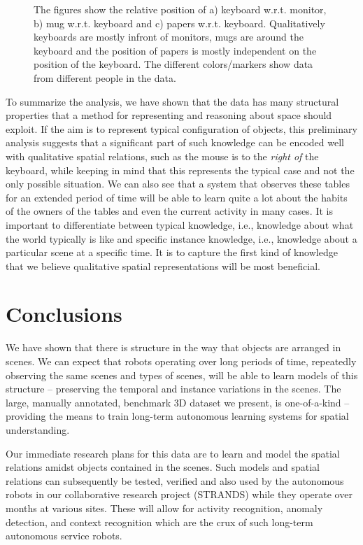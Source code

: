 \documentclass[letterpaper, 10 pt, conference]{ieeeconf}  %
\begin{document}
\begin{figure}[t]
\begin{center}
\end{center}
\caption{The figures show the relative position of a) keyboard w.r.t. monitor, b) mug w.r.t. keyboard and c) papers w.r.t. keyboard. Qualitatively keyboards are mostly infront of monitors, mugs are around the keyboard and the position of papers is mostly independent on the position of the keyboard. The different colors/markers show data from different people in the data.} 
\label{fig:scatter-rest}
\end{figure}

To summarize the analysis, we have shown that the data has many structural 
properties that a method for representing and reasoning about 
space should exploit. If the aim is to represent typical configuration of 
objects, this preliminary analysis suggests that a significant 
part of such knowledge can be encoded well with qualitative spatial 
relations, such as the mouse is to the \textit{right of} the keyboard, while 
keeping in mind that this represents the typical case and not the only 
possible situation. We can also see that a system that observes these tables for 
an extended period of time will be able to learn quite a lot about the 
habits of the owners of the tables and even the current activity in 
many cases. It is important to differentiate between typical knowledge, 
i.e., knowledge about what the world typically is like and specific 
instance knowledge, i.e., knowledge about a particular scene at a specific 
time. It is to capture the first kind of knowledge that we 
believe  qualitative spatial representations will be most beneficial. 

\section{Conclusions}
\label{sec:Conclusions}

We have shown that there is structure in the way that objects are
arranged in scenes.  We can expect that robots operating over long periods 
of time, repeatedly observing the same scenes and types of scenes, 
will be able to learn models of this structure -- preserving the temporal 
and instance variations in the scenes. 
The large, manually annotated, benchmark 3D dataset we present, is one-of-a-kind -- 
providing the means to train long-term autonomous learning systems for spatial understanding.

Our immediate research plans for this data are to learn and model the spatial relations amidst objects contained in the scenes. Such models and spatial relations can subsequently be tested, verified and also used by the autonomous robots in our collaborative research project (STRANDS) while they operate over months at various sites.  These will
allow for activity recognition, anomaly detection, and context recognition which are the crux of such long-term autonomous service robots.
\end{document}
